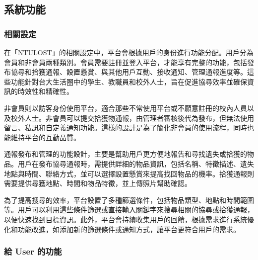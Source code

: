 \documentclass[12pt,a4paper]{article}
\begin{document}

\subsection{系統功能}    

\subsubsection{相關設定}

在「NTULOST」的相關設定中，平台會根據用戶的身份進行功能分配。用戶分為會員和非會員兩種類別。會員需要註冊並登入平台，才能享有完整的功能，包括發布協尋和拾獲通報、設置懸賞、與其他用戶互動、接收通知、管理通報進度等。這些功能針對台大生活圈中的學生、教職員和校外人士，旨在促進協尋效率並確保資訊的時效性和精確性。

非會員則以訪客身份使用平台，適合那些不常使用平台或不願意註冊的校內人員以及校外人士。非會員可以提交拾獲物通報，由管理者審核後代為發布，但無法使用留言、私訊和自定義通知功能。這樣的設計是為了簡化非會員的使用流程，同時也能維持平台的互動品質。

通報發布和管理的功能設計，主要是幫助用戶更方便地報告和尋找遺失或拾獲的物品。用戶在發布協尋通報時，需提供詳細的物品資訊，包括名稱、特徵描述、遺失地點與時間、聯絡方式，並可以選擇設置懸賞來提高找回物品的機率。拾獲通報則需要提供尋獲地點、時間和物品特徵，並上傳照片幫助確認。

為了提高搜尋的效率，平台設置了多種篩選條件，包括物品類型、地點和時間範圍等。用戶可以利用這些條件篩選或直接輸入關鍵字來搜尋相關的協尋或拾獲通報，以便快速找到目標資訊。此外，平台會持續收集用戶的回饋，根據需求進行系統優化和功能改進，如添加新的篩選條件或通知方式，讓平台更符合用戶的需求。


\subsubsection{給 User 的功能}
\end{document}
